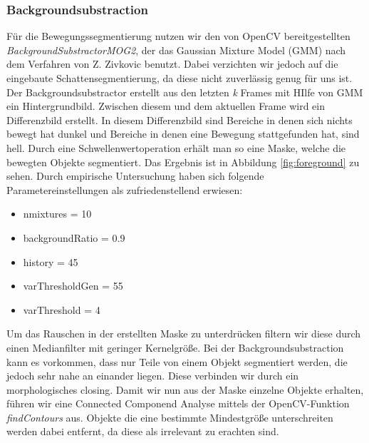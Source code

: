 \documentclass[conference]{IEEEtran}
\begin{document}
\subsubsection{Backgroundsubstraction}
Für die Bewegungssegmentierung nutzen wir den von OpenCV bereitgestellten \textit{BackgroundSubstractorMOG2}, der das Gaussian Mixture Model (GMM) nach dem Verfahren von Z. Zivkovic \cite{zivkovic} benutzt. Dabei verzichten wir jedoch auf die eingebaute Schattensegmentierung, da diese nicht zuverlässig genug für uns ist. Der Backgroundsubstractor erstellt aus den letzten \textit{k} Frames mit HIlfe von GMM ein Hintergrundbild. Zwischen diesem und dem aktuellen Frame wird ein Differenzbild erstellt. In diesem Differenzbild sind Bereiche in denen sich nichts bewegt hat dunkel und Bereiche in denen eine Bewegung stattgefunden hat, sind hell. Durch eine Schwellenwertoperation erhält man so eine Maske, welche die bewegten Objekte segmentiert. Das Ergebnis ist in Abbildung \ref{fig:foreground} zu sehen.
Durch empirische Untersuchung haben sich folgende Parametereinstellungen als zufriedenstellend erwiesen:
\begin{itemize}
	\item nmixtures = 10
	\item backgroundRatio = 0.9
	\item history = 45
	\item varThresholdGen = 55
	\item varThreshold = 4
\end{itemize}
Um das Rauschen in der erstellten Maske zu unterdrücken filtern wir diese durch einen Medianfilter mit geringer Kernelgröße. Bei der Backgroundsubstraction kann es vorkommen, dass nur Teile von einem Objekt segmentiert werden, die jedoch sehr nahe an einander liegen. Diese verbinden wir durch ein morphologisches closing.
Damit wir nun aus der Maske einzelne Objekte erhalten, führen wir eine Connected Componend Analyse mittels der OpenCV-Funktion \textit{findContours} aus. Objekte die eine bestimmte Mindestgröße unterschreiten werden dabei entfernt, da diese als irrelevant zu erachten sind.
\end{document}

